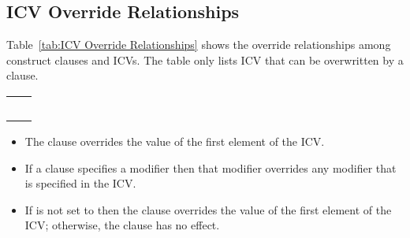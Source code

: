 \subsection{ICV Override Relationships}
\label{subsec:ICV Override Relationships}

Table~\ref{tab:ICV Override Relationships} shows the override relationships
among construct clauses and ICVs. The table only lists ICV that can be overwritten by a clause.

\nolinenumbers
\renewcommand{\arraystretch}{1.5}
\tablelasttail{\hline}
\begin{supertabular}{ p{1.3in} p{2.0in}}
{}          & {}\\
{}         & {}\\
{}         & {}\\
{}              & {}\\
{}     & {}\\
\end{supertabular}

\linenumbers

\descr
\begin{itemize}
\item The  clause overrides the value of the first element of the
       ICV.
\item If a  clause specifies a modifier then that modifier overrides 
      any modifier that is specified in the  ICV.
\item If  is not set to  then the  clause 
      overrides the value of the first element of the  ICV; otherwise, 
      the  clause has no effect.
\end{itemize}

